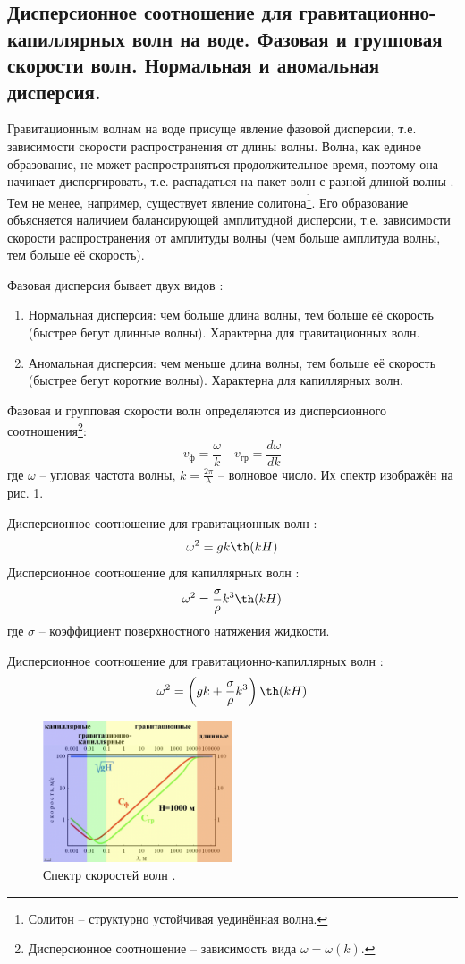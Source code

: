 \subsection{Дисперсионное соотношение для гравитационно-капиллярных волн на воде. Фазовая и групповая скорости волн. Нормальная и аномальная дисперсия.}
Гравитационным волнам на воде присуще явление фазовой дисперсии, т.е. зависимости скорости распространения от длины волны.
Волна, как единое образование, не может распространяться продолжительное время, поэтому она начинает диспергировать, т.е. распадаться на пакет волн с разной длиной волны \cite{Носов-2019-13}.
Тем не менее, например, существует явление солитона\footnote{Солитон -- структурно устойчивая уединённая волна.}.
Его образование объясняется наличием балансирующей амплитудной дисперсии, т.е. зависимости скорости распространения от амплитуды волны (чем больше амплитуда волны, тем больше её скорость).

Фазовая дисперсия бывает двух видов \cite{Носов-2019-13}:
\begin{enumerate}
\item Нормальная дисперсия: чем больше длина волны, тем больше её скорость (быстрее бегут длинные волны). Характерна для гравитационных волн.
\item Аномальная дисперсия: чем меньше длина волны, тем больше её скорость (быстрее бегут короткие волны). Характерна для капиллярных волн.
\end{enumerate}

Фазовая и групповая скорости волн определяются из дисперсионного соотношения\footnote{Дисперсионное соотношение -- зависимость вида $\omega=\omega(k)$.}:
\begin{equation}
v_\text{ф}=\frac{\omega}{k}\quad v_\text{гр}=\frac{d\omega}{dk}
\end{equation}
где $\omega$ -- угловая частота волны, $k=\frac{2\pi}{\lambda}$ -- волновое число.
Их спектр изображён на рис. \ref{fig:v_spectrum}.

Дисперсионное соотношение для гравитационных волн \cite{Носов-2021}:
\begin{equation}
\omega^2=gk\th(kH)
\end{equation}
Дисперсионное соотношение для капиллярных волн \cite{Носов-2021}:
\begin{equation}
\omega^2=\frac{\sigma}{\rho}k^3\th(kH)
\end{equation}
где $\sigma$ -- коэффициент поверхностного натяжения жидкости.

Дисперсионное соотношение для гравитационно-капиллярных волн \cite{Носов-2021}:
\begin{equation}
\omega^2=\left(gk+\frac{\sigma}{\rho}k^3\right)\th(kH)
\end{equation}

\begin{figure}[!ht]
\centering
\includegraphics[width=0.5\textwidth]{images/v_spectrum.png}
\caption{Спектр скоростей волн \cite{Носов-2019-13}.}\label{fig:v_spectrum}
\end{figure}
